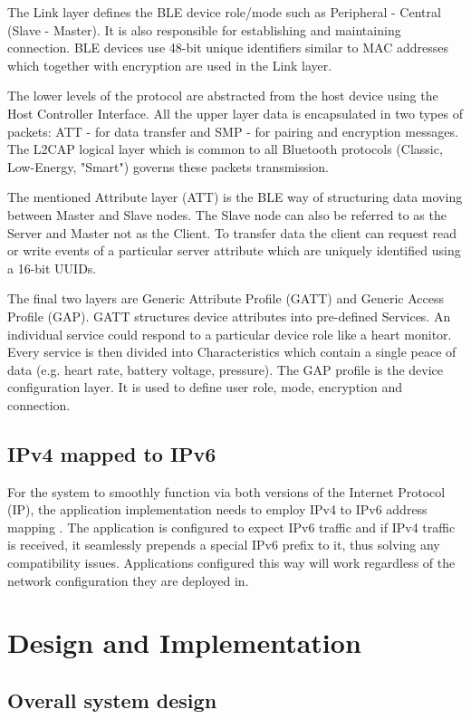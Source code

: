 \documentclass[conference]{IEEEtran}
\begin{document}
The Link layer defines the BLE device role/mode such as Peripheral - Central (Slave - Master). It is also responsible for establishing and maintaining connection. BLE devices use 48-bit unique identifiers similar to MAC addresses which together with encryption are used in the Link layer.

The lower levels of the protocol are abstracted from the host device using the Host Controller Interface. All the upper layer data is encapsulated in two types of packets: ATT - for data transfer and SMP - for pairing and encryption messages. The L2CAP logical layer which is common to all Bluetooth protocols (Classic, Low-Energy, "Smart") governs these packets transmission.

The mentioned Attribute layer (ATT) is the BLE way of structuring data moving between Master and Slave nodes. The Slave node can also be referred to as the Server and Master not as the Client. To transfer data the client can request read or write events of a particular server attribute which are uniquely identified using a 16-bit UUIDs. 

The final two layers are Generic Attribute Profile (GATT) and Generic Access Profile (GAP). GATT structures device attributes into pre-defined Services. An individual service could respond to a particular device role like a heart monitor. Every service is then divided into Characteristics which contain a single peace of data (e.g. heart rate, battery voltage, pressure). The GAP profile is the device configuration layer. It is used to define user role, mode, encryption and connection. 

\subsection{IPv4 mapped to IPv6}
For the system to smoothly function via both versions of the Internet Protocol (IP), the application implementation needs to employ IPv4 to IPv6 address mapping \cite{ipv6_mapping}. The application is configured to expect IPv6 traffic and if IPv4 traffic is received, it seamlessly prepends a special IPv6 prefix to it, thus solving any compatibility issues. Applications configured this way will work regardless of the network configuration they are deployed in.


\section{Design and Implementation}
\subsection{Overall system design}
\end{document}
